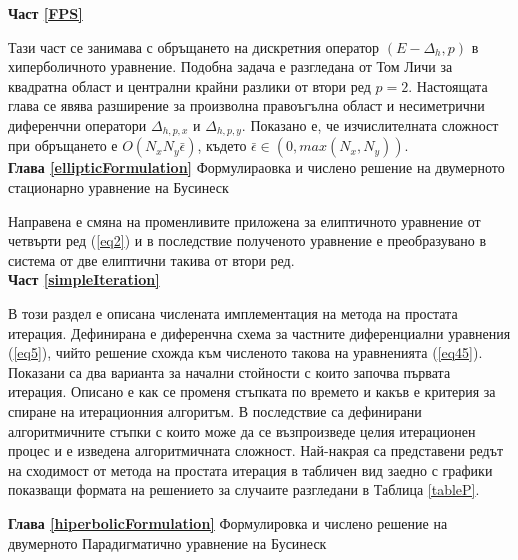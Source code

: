 \documentclass{article}
\newcommand{\rf}[1]{(\ref{#1})}
\theoremstyle{remark}
\begin{document}
\textbf{Част \ref{FPS}}

Тази част се занимава с обръщането на дискретния оператор $(E-\Delta_h,p)$ в хиперболичното уравнение. Подобна задача е разгледана от Том Личи за квадратна област и централни крайни разлики от втори ред $p=2$. Настоящата глава се явява разширение за произволна правоъгълна област и несиметрични диференчни оператори $\Delta_{h,p,x}$ и $\Delta_{h,p,y}$. Показано е, че изчислителната сложност при обръщането е $O(N_x N_y \bar{\epsilon})$, където $\bar{\epsilon} \in (0, max(N_x, N_y))$.\\

\textbf{Глава \ref{ellipticFormulation}} Формулираовка и числено решение на двумерното стационарно уравнение на Бусинеск

Направена е смяна на променливите приложена за елиптичното уравнение от четвърти ред \rf{eq2} и в последствие полученото уравнение е преобразувано в система от две елиптични такива от втори ред. \\

\textbf{Част \ref{simpleIteration}}

В този раздел е описана числената имплементация на метода на простата итерация. Дефинирана е диференчна схема за частните диференциални уравнения \rf{eq5}, чийто решение схожда към численото такова на уравненията \rf{eq45}. Показани са два варианта за начални стойности с които започва първата итерация. Описано е как се променя стъпката по времето и какъв е критерия за спиране на итерационния алгоритъм. В последствие са дефинирани алгоритмичните стъпки с които може да се възпроизведе целия итерационен процес и е изведена алгоритмичната сложност. Най-накрая са представени редът на сходимост от метода на простата итерация в табличен вид заедно с графики показващи формата на решението за случаите разгледани в Таблица \ref{tableP}.

\textbf{Глава \ref{hiperbolicFormulation}} Формулировка и числено решение на двумерното Парадигматично уравнение на Бусинеск
\end{document}
